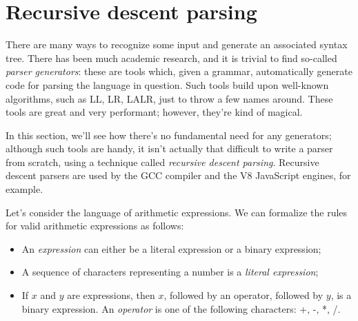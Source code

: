 \documentclass[11pt, american, draft]{PhdThesis}
\begin{document}
  \section{Recursive descent parsing}

  There are many ways to recognize some input and generate an associated syntax tree. There has been
  much academic research, and it is trivial to find so-called \emph{parser generators}: these are
  tools which, given a grammar, automatically generate code for parsing the language in question.
  Such tools build upon well-known algorithms, such as LL, LR, LALR, just to throw a few names
  around. These tools are great and very performant; however, they're kind of magical.

  In this section, we'll see how there's no fundamental need for any generators; although such tools
  are handy, it isn't actually that difficult to write a parser from scratch, using a technique
  called \emph{recursive descent parsing}. Recursive descent parsers are used by the GCC compiler
  and the V8 JavaScript engines, for example\cite{nystrom}.

  Let's consider the language of arithmetic expressions. We can formalize the rules for valid
  arithmetic expressions as follows:

  \begin{itemize}
    \item An \emph{expression} can either be a literal expression or a binary expression;

    \item A sequence of characters representing a number is a \emph{literal expression};

    \item If $x$ and $y$ are expressions, then $x$, followed by an operator, followed by $y$, is a
          binary expression. An \emph{operator} is one of the following characters: \mbox{+},
          \mbox{-}, \mbox{*}, \mbox{/}.
  \end{itemize}

  \backmatter





  \backmatter

  
  

\end{document}
